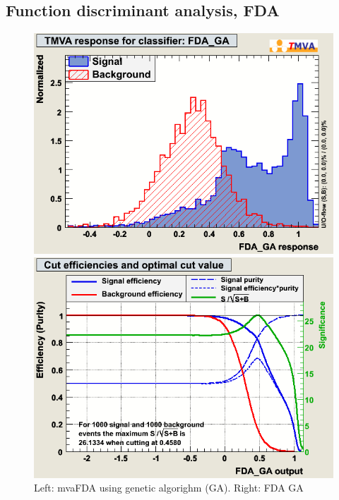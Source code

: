 \subsection{Function discriminant analysis, FDA}

 
\begin{figure}[h]
 \begin{minipage}{8.5cm}
\includegraphics[width=1.0\textwidth]{images/pkMva_FDA_GA.png}
\end{minipage}
 \hfill
\begin{minipage}{8.5cm}
\includegraphics[width=1.0\textwidth]{images/pkMvaEffs_FDA_GA.png}
\end{minipage}
\caption{Left: mvaFDA using genetic algorighm (GA). Right: FDA GA}
\label{fig:pkMvaFDAGA}
\end{figure}


